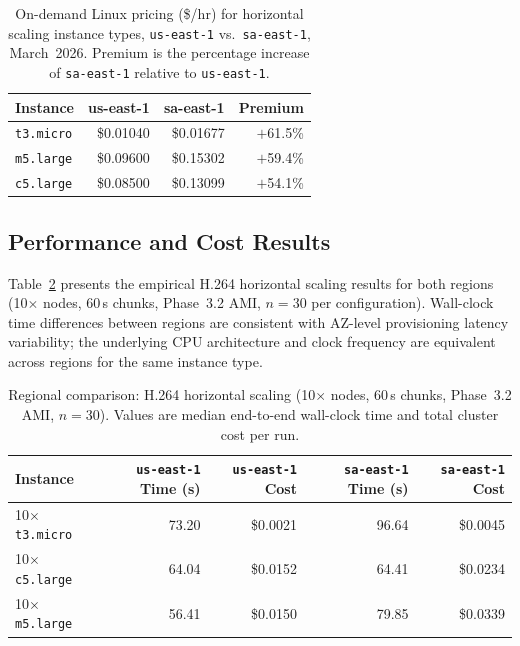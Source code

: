 \documentclass[conference]{IEEEtran}
\begin{document}
\begin{table}[!htbp]
\centering
\caption{On-demand Linux pricing (\$/hr) for horizontal scaling instance types,
\texttt{us-east-1} vs.\ \texttt{sa-east-1}, March~2026. Premium is the
percentage increase of \texttt{sa-east-1} relative to \texttt{us-east-1}.}
\label{tab:app_regional_pricing}
\small
\begin{tabular}{lrrr}
\toprule
\textbf{Instance} & \textbf{us-east-1} & \textbf{sa-east-1} & \textbf{Premium} \\
\midrule
\texttt{t3.micro}  & \$0.01040 & \$0.01677 & $+$61.5\% \\
\texttt{m5.large}  & \$0.09600 & \$0.15302 & $+$59.4\% \\
\texttt{c5.large}  & \$0.08500 & \$0.13099 & $+$54.1\% \\
\bottomrule
\end{tabular}
\end{table}

\subsection{Performance and Cost Results}

Table~\ref{tab:app_regional_results} presents the empirical H.264 horizontal
scaling results for both regions (10$\times$ nodes, 60\,s chunks, Phase~3.2 AMI,
$n=30$ per configuration). Wall-clock time differences between regions are
consistent with AZ-level provisioning latency variability; the underlying CPU
architecture and clock frequency are equivalent across regions for the same
instance type.

\begin{table}[!htbp]
\centering
\caption{Regional comparison: H.264 horizontal scaling (10$\times$ nodes,
60\,s chunks, Phase~3.2 AMI, $n=30$). Values are median end-to-end
wall-clock time and total cluster cost per run.}
\label{tab:app_regional_results}
\small
\begin{tabular}{lrrrr}
\toprule
\textbf{Instance} & \textbf{\texttt{us-east-1} Time (s)} & \textbf{\texttt{us-east-1} Cost}
  & \textbf{\texttt{sa-east-1} Time (s)} & \textbf{\texttt{sa-east-1} Cost} \\
\midrule
10$\times$\texttt{t3.micro}  & 73.20  & \$0.0021 & 96.64  & \$0.0045 \\
10$\times$\texttt{c5.large}  & 64.04  & \$0.0152 & 64.41  & \$0.0234 \\
10$\times$\texttt{m5.large}  & 56.41  & \$0.0150 & 79.85  & \$0.0339 \\
\bottomrule
\end{tabular}
\end{table}
\end{document}
